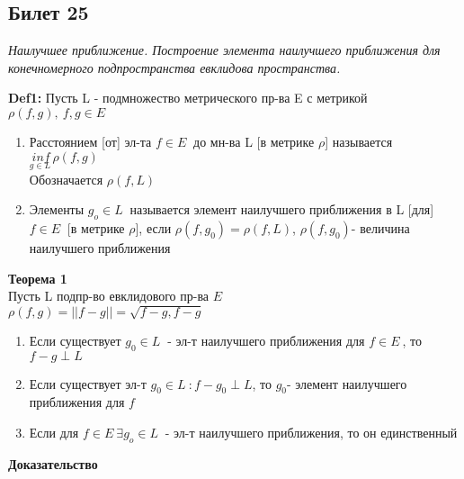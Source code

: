 \subsection{Билет 25}


\textit{Наилучшее приближение. Построение элемента наилучшего приближения для конечномерного подпространства евклидова пространства.}


\textbf{Def1:} Пусть L - подмножество метрического пр-ва E с метрикой $\rho(f,g), \ f,g \in E\ $ 
\begin{enumerate}
 \item Расстоянием [от] эл-та $f \in E\ $ до мн-ва L [в метрике $\rho$] называется $\underset {g \in L\ }{inf} \rho(f,g) $ \\
       Обозначается $\rho(f,L)$
 \item Элементы $g_o \in L\ $ называется элемент наилучшего приближения в L [для] $f \in E\ $ [в метрике $\rho$], если 
       $\rho(f,g_0)=\rho(f,L)$, $\rho(f,g_0)$- величина наилучшего приближения
\end{enumerate}
\textbf{Теорема 1} \\
Пусть L подпр-во евклидового пр-ва $E$ \\
$\rho(f,g) = \left| \left| f-g \right| \right| = \sqrt{f-g,f-g}$ 
\begin{enumerate}
 \item Если существует $g_0 \in L\ $ - эл-т наилучшего приближения для $f \in E\ $, то $f-g \perp L $
 \item Если существует эл-т $g_0 \in L\ : f-g_0 \perp L$, то $g_0$- элемент наилучшего приближения для $f$   
 \item Если для $f \in E\ \exists g_o \in L\ $ - эл-т наилучшего приближения, то он единственный
\end{enumerate}
\textbf{Доказательство} \\

